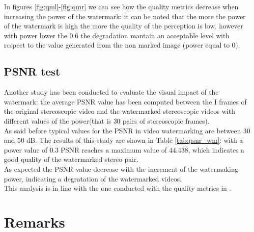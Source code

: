 In figures \ref{fig:qml}-\ref{fig:qmr} we can see how the quality metrics decrease when increasing the power of the watermark: it can be noted that the more the power of the watermark is high the more the quality of the perception is low, however with power lower the 0.6 the degradation mantain an acceptable level with respect to the value generated from the non marked image (power equal to 0).

\subsection{PSNR test}

Another study has been conducted to evaluate the visual impact of the watermark: the average PSNR value has been computed between the I frames of the original stereoscopic video and the watermarked stereoscopic videos with different values of the power(that is 30 pairs of stereoscopic frames).\\
As said before typical values for the PSNR in video watermarking are between 30 and 50 dB.
The results of this study are shown in Table \ref{tab:psnr_wm}: with a power value of $0.3$ PSNR reaches a maximum value of $44.438$, which indicates a good quality of the watermarked stereo pair. \\
As expected the PSNR value decrease with the increment of the watermaking power, indicating a degratation of the watermarked videos.\\ This analysis is in line with the one conducted with the quality metrics in \cite{QMETRICS}.

\begin{table}[h!]
\begin{center}
\caption{\small{Average PSNR values between original video and watermarked videos with increasing value of the power.} \label{tab:psnr_wm}}
\end{center}
\end{table}
\clearpage
\section{Remarks}

